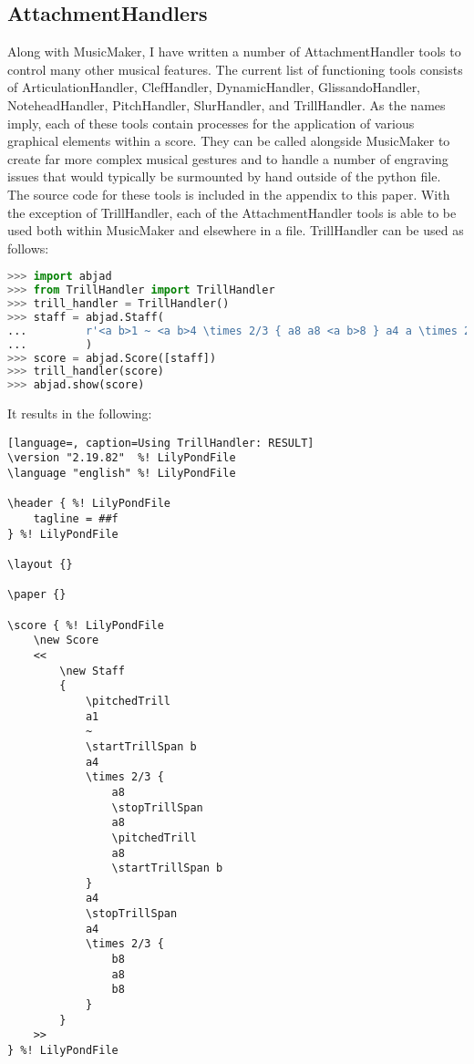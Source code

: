 \subsection{AttachmentHandlers}

Along with MusicMaker, I have written a number of AttachmentHandler tools to control many other musical features. The current list of functioning tools consists of ArticulationHandler, ClefHandler, DynamicHandler, GlissandoHandler, NoteheadHandler, PitchHandler, SlurHandler, and TrillHandler. As the names imply, each of these tools contain processes for the application of various graphical elements within a score. They can be called alongside MusicMaker to create far more complex musical gestures and to handle a number of engraving issues that would typically be surmounted by hand outside of the python file. The source code for these tools is included in the appendix to this paper. With the exception of TrillHandler, each of the AttachmentHandler tools is able to be used both within MusicMaker and elsewhere in a file. TrillHandler can be used as follows:

\singlespace
\begin{lstlisting}[language=Python, caption=Using TrillHandler]
>>> import abjad
>>> from TrillHandler import TrillHandler
>>> trill_handler = TrillHandler()
>>> staff = abjad.Staff(
... 		r'<a b>1 ~ <a b>4 \times 2/3 { a8 a8 <a b>8 } a4 a \times 2/3 { b8 a b }'
... 		)
>>> score = abjad.Score([staff])
>>> trill_handler(score)
>>> abjad.show(score)
\end{lstlisting}
\doublespace

It results in the following:

\singlespace
\begin{lstlisting}[language=, caption=Using TrillHandler: RESULT]
\version "2.19.82"  %! LilyPondFile
\language "english" %! LilyPondFile

\header { %! LilyPondFile
    tagline = ##f
} %! LilyPondFile

\layout {}

\paper {}

\score { %! LilyPondFile
    \new Score
    <<
        \new Staff
        {
            \pitchedTrill
            a1
            ~
            \startTrillSpan b
            a4
            \times 2/3 {
                a8
                \stopTrillSpan
                a8
                \pitchedTrill
                a8
                \startTrillSpan b
            }
            a4
            \stopTrillSpan
            a4
            \times 2/3 {
                b8
                a8
                b8
            }
        }
    >>
} %! LilyPondFile
\end{lstlisting}
\doublespace

